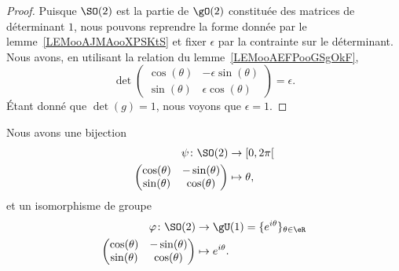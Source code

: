 \begin{proof}
	Puisque \( \SO(2)\) est la partie de \( \gO(2)\) constituée des matrices de déterminant \( 1\), nous pouvons reprendre la forme donnée par le lemme~\ref{LEMooAJMAooXPSKtS} et fixer \( \epsilon\) par la contrainte sur le déterminant. Nous avons, en utilisant la relation du lemme~\ref{LEMooAEFPooGSgOkF},
	\begin{equation}
		\det\begin{pmatrix}
			\cos(\theta) & -\epsilon\sin(\theta) \\
			\sin(\theta) & \epsilon\cos(\theta)
		\end{pmatrix}=\epsilon.
	\end{equation}
	Étant donné que \( \det(g)=1\), nous voyons que \( \epsilon=1\).
\end{proof}

\begin{corollary}        \label{CORooGGVUooLQYGET}
	Nous avons une bijection
	\begin{equation}
		\begin{aligned}
			\psi\colon \SO(2) & \to \mathopen[ 0 , 2\pi \mathclose[ \\
			\begin{pmatrix}
				\cos(\theta) & -\sin(\theta) \\
				\sin(\theta) & \cos(\theta)
			\end{pmatrix}
			                  & \mapsto \theta,
		\end{aligned}
	\end{equation}
	et un isomorphisme de groupe
	\begin{equation}
		\begin{aligned}
			\varphi\colon \SO(2) & \to \gU(1)=\{  e^{i\theta} \}_{\theta\in \eR} \\
			\begin{pmatrix}
				\cos(\theta) & -\sin(\theta) \\
				\sin(\theta) & \cos(\theta)
			\end{pmatrix}
			                     & \mapsto  e^{i\theta}.
		\end{aligned}
	\end{equation}
\end{corollary}

